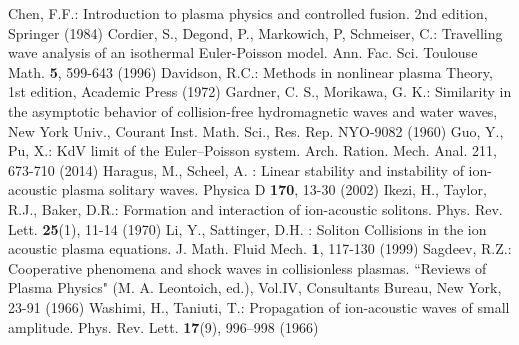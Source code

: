 \documentclass{amsart}
\newcommand{\veps}{\varepsilon}
\numberwithin{equation}{section}
\theoremstyle{plain}%
\theoremstyle{definition}
\theoremstyle{remark}
\theoremstyle{remark}
\begin{document}

\begin{thebibliography}{10}

 Chen, F.F.: Introduction to plasma physics and controlled fusion. 2nd edition, Springer (1984)
 Cordier, S., Degond, P., Markowich, P, Schmeiser, C.: Travelling wave analysis of an isothermal Euler-Poisson model. Ann. Fac. Sci. Toulouse Math. \textbf{5}, 599-643 (1996)
 Davidson, R.C.: Methods in nonlinear plasma Theory, 1st edition, Academic Press (1972)
 Gardner, C. S., Morikawa, G. K.: Similarity in the asymptotic behavior of collision-free hydromagnetic waves and water waves, New York Univ., Courant Inst. Math. Sci., Res. Rep. NYO-9082 (1960)
 Guo, Y., Pu, X.: KdV limit of the Euler–Poisson system. Arch. Ration. Mech. Anal. 211, 673-710 (2014)
 Haragus, M., Scheel, A. : Linear stability and instability of ion-acoustic plasma solitary waves. Physica D \textbf{170}, 13-30 (2002)
 Ikezi, H., Taylor, R.J., Baker, D.R.: Formation and interaction of ion-acoustic solitons. Phys. Rev. Lett. \textbf{25}(1), 11-14 (1970)
 Li, Y., Sattinger, D.H. : Soliton Collisions in the ion acoustic plasma equations. J. Math. Fluid Mech. \textbf{1}, 117-130 (1999)
 Sagdeev, R.Z.: Cooperative phenomena and shock waves in collisionless plasmas. ``Reviews of Plasma Physics" (M. A. Leontoich, ed.), Vol.IV, Consultants Bureau, New York, 23-91 (1966)
 Washimi, H., Taniuti, T.: Propagation of ion-acoustic waves of small amplitude. Phys. Rev. Lett. \textbf{17}(9), 996–998 (1966)





\end{thebibliography}



\end{document}

